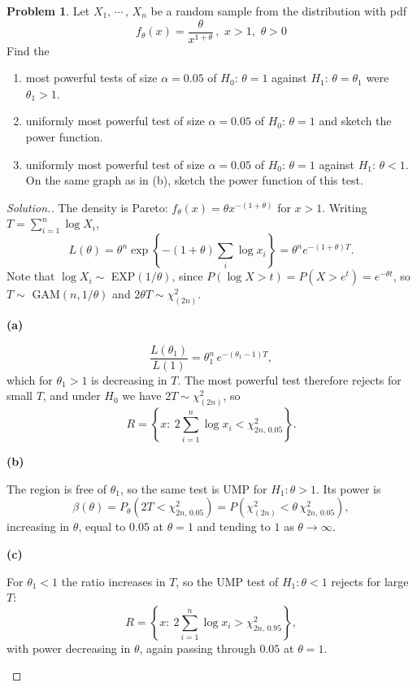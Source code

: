 \documentclass[12pt,a4paper]{report}
\theoremstyle{definition}
\newcommand{\subhead}[1]{%
  \par\medskip\noindent\textbf{#1}\par\nobreak\smallskip}
\newtheorem{problemx}{Problem}[section]
\newenvironment{problem}{\begin{problemx}}{\end{problemx}}
\newenvironment{solution}
  {\renewcommand{\qedsymbol}{}\begin{proof}[\textit{Solution}.]}
  {\end{proof}}
\begin{document}
\begin{problem}
Let $X_1, \, \cdots\,, \, X_n$ be a random sample from the distribution with pdf \[f_{\theta}(x) = \frac{\theta}{x^{1 + \theta}}\, , \, \, x> 1, \, \, \theta > 0\] Find the
\begin{enumerate}
\item[(a)] most powerful tests of size $\alpha = 0.05$ of $H_0:\, \theta = 1$ against $H_1:\, \theta = \theta_1$ were $\theta_1  > 1$.
\item[(b)] uniformly most powerful test of size $\alpha = 0.05$ of $H_0:\, \theta = 1$ and sketch the power function.
\item[(c)] uniformly most powerful test of size $\alpha = 0.05$ of $H_0:\, \theta = 1$ against $H_1:\, \theta < 1$. On the same graph as in (b), sketch the power function of this test.
\end{enumerate}
\end{problem}

\begin{solution}
The density is Pareto: $f_{\theta}(x)=\theta x^{-(1+\theta)}$ for $x>1$. Writing
$T=\sum_{i=1}^{n}\log X_i$,
\[L(\theta) = \theta^{n}\exp\left\{-(1+\theta)\sum_i\log x_i\right\}
= \theta^{n}e^{-(1+\theta)T}.\]
Note that $\log X_i \sim$ EXP$(1/\theta)$, since
$P\left(\log X>t\right)=P\left(X>e^{t}\right)=e^{-\theta t}$, so
$T\sim$ GAM$(n,1/\theta)$ and $2\theta T\sim\chi^{2}_{(2n)}$.

\subhead{(a)}
\[\frac{L(\theta_1)}{L(1)} = \theta_1^{n}\,e^{-(\theta_1-1)T},\]
which for $\theta_1>1$ is decreasing in $T$. The most powerful test therefore
rejects for small $T$, and under $H_0$ we have $2T\sim\chi^{2}_{(2n)}$, so
\[R = \left\{x:\ 2\sum_{i=1}^{n}\log x_i < \chi^{2}_{2n,\,0.05}\right\}.\]

\subhead{(b)}
The region is free of $\theta_1$, so the same test is UMP for $H_1:\theta>1$.
Its power is
\[\beta(\theta) = P_{\theta}\left(2T<\chi^{2}_{2n,\,0.05}\right)
= P\left(\chi^{2}_{(2n)} < \theta\,\chi^{2}_{2n,\,0.05}\right),\]
increasing in $\theta$, equal to $0.05$ at $\theta=1$ and tending to $1$ as
$\theta\rightarrow\infty$.

\subhead{(c)}
For $\theta_1<1$ the ratio increases in $T$, so the UMP test of $H_1:\theta<1$
rejects for large $T$:
\[R = \left\{x:\ 2\sum_{i=1}^{n}\log x_i > \chi^{2}_{2n,\,0.95}\right\},\]
with power decreasing in $\theta$, again passing through $0.05$ at $\theta=1$.

\begin{center}
\end{center}
\end{solution}
\end{document}

